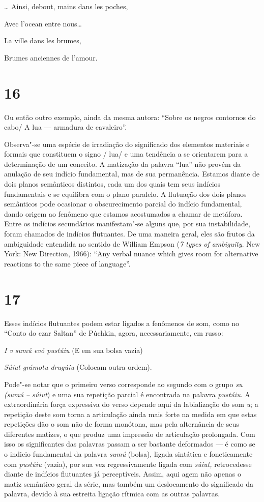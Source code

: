 \ldots{} Ainsi, debout, mains dans les poches,

Avec l'ocean entre nous\ldots{}

La ville dans les brumes,

Brumes anciennes de l'amour.

\section{16}

Ou então outro exemplo, ainda da mesma autora: ``Sobre os negros contornos
do cabo/ A lua --- armadura de cavaleiro''.

Observa"-se uma espécie de irradiação do significado dos elementos
materiais e formais que constituem o signo / lua/ e uma tendência a se
orientarem para a determinação de um conceito. A matização da palavra
``lua'' não provém da anulação de seu indício fundamental, mas de sua
permanência. Estamos diante de dois planos semânticos distintos, cada um
dos quais tem seus indícios fundamentais e se equilibra com o plano
paralelo. A flutuação dos dois planos semânticos pode ocasionar o
obscurecimento parcial do indício fundamental, dando origem ao fenômeno
que estamos acostumados a chamar de metáfora. Entre os indícios
secundários manifestam"-se alguns que, por sua instabilidade, foram
chamados de indícios flutuantes. De uma maneira geral, eles são frutos
da ambiguidade entendida no sentido de William Empson (\emph{7 types of ambiguity}. New York: New Direction, 1966): ``Any
verbal nuance which gives room for alternative reactions to the same
piece of language''.

\section{17}

Esses indícios flutuantes podem estar ligados a fenômenos de som, como
no ``Conto do czar Saltan'' de Púchkin, agora, necessariamente, em
russo:

\emph{I v sumú evó pustúiu} (E em sua bolsa vazia)

\emph{Súiut grámotu drugúiu} (Colocam outra ordem).

Pode"-se notar que o primeiro verso corresponde ao segundo com o grupo
\emph{su (sumú -- súiut}) e uma sua repetição parcial é encontrada na
palavra \emph{pustúiu}. A extraordinária força expressiva do verso
depende aqui da labialização do som \emph{u}; a repetição deste som torna a
articulação ainda mais forte na medida em que estas repetições dão o som
não de forma monótona, mas pela alternância de seus diferentes matizes,
o que produz uma impressão de articulação prolongada. Com isso os
significantes das palavras passam a ser bastante deformados --- é como se
o indicio fundamental da palavra \emph{sumú} (bolsa), ligada sintática e
foneticamente com \emph{pustúiu} (vazia), por sua vez regressivamente
ligada com \emph{súiut,} retrocedesse diante de indícios flutuantes já
perceptíveis. Assim, aqui agem não apenas o matiz semântico geral da
série, mas também um deslocamento do significado da palavra, devido à
sua estreita ligação rítmica com as outras palavras.

